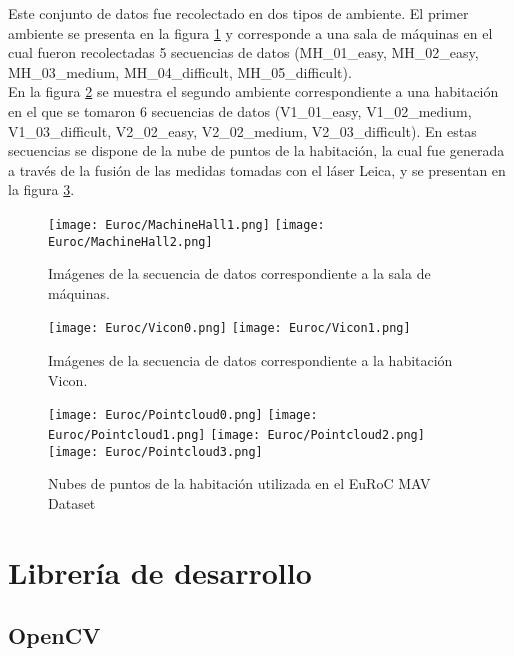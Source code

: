 Este conjunto de datos fue recolectado en dos tipos de ambiente. El primer ambiente se presenta en la figura \ref{fig:machineHall} y  corresponde a una sala de máquinas en el cual fueron recolectadas 5 secuencias de datos (MH\_01\_easy, MH\_02\_easy, MH\_03\_medium, MH\_04\_difficult, MH\_05\_difficult). \\

En la figura \ref{fig:vicon} se muestra el segundo ambiente correspondiente a una habitación en el que se tomaron 6 secuencias de datos (V1\_01\_easy, V1\_02\_medium, V1\_03\_difficult, V2\_02\_easy, V2\_02\_medium, V2\_03\_difficult). En estas secuencias se dispone de la nube de puntos de la habitación, la cual fue generada a través de la fusión de las medidas tomadas con el láser Leica, y se presentan en la figura \ref{fig:pointcloudEuroc}.\\

\begin{figure}[H]
	\centering
	\texttt{[image: Euroc/MachineHall1.png]}
	\texttt{[image: Euroc/MachineHall2.png]}
	\caption{Imágenes de la secuencia de datos correspondiente a la sala de máquinas.}
	\label{fig:machineHall}
\end{figure}


\begin{figure}[H]
	\centering
	\texttt{[image: Euroc/Vicon0.png]}
	\texttt{[image: Euroc/Vicon1.png]}
	\caption{Imágenes de la secuencia de datos correspondiente a la habitación Vicon.}
	\label{fig:vicon}
\end{figure}


\begin{figure}[H]
	\centering
	\texttt{[image: Euroc/Pointcloud0.png]}
	\texttt{[image: Euroc/Pointcloud1.png]}
	\texttt{[image: Euroc/Pointcloud2.png]}
	\texttt{[image: Euroc/Pointcloud3.png]}
	\caption{Nubes de puntos de la habitación utilizada en el EuRoC MAV Dataset}
	\label{fig:pointcloudEuroc}
\end{figure}



\section{Librería de desarrollo}

\subsection{OpenCV}

